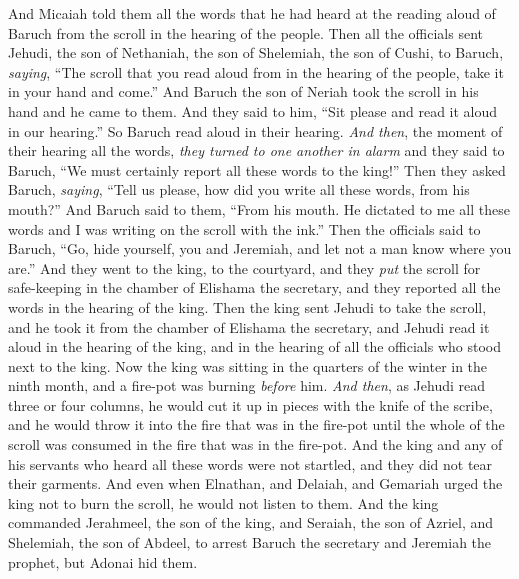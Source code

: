 \begin{biblechapter}
\verse And Micaiah told them all the words that he had heard at the reading aloud of Baruch from the scroll in the hearing of the people.
\verse Then all the officials sent Jehudi, the son of Nethaniah, the son of Shelemiah, the son of Cushi, to Baruch, \textit{saying}, “The scroll that you read aloud from in the hearing of the people, take it in your hand and come.” And Baruch the son of Neriah took the scroll in his hand and he came to them.
\verse And they said to him, “Sit please and read it aloud in our hearing.” So Baruch read aloud in their hearing.
\verse \textit{And then}, the moment of their hearing all the words, \textit{they turned to one another in alarm} and they said to Baruch, “We must certainly report all these words to the king!”
\verse Then they asked Baruch, \textit{saying}, “Tell us please, how did you write all these words, from his mouth?”
\verse And Baruch said to them, “From his mouth. He dictated to me all these words and I was writing on the scroll with the ink.”
\verse Then the officials said to Baruch, “Go, hide yourself, you and Jeremiah, and let not a man know where you are.”
\verse And they went to the king, to the courtyard, and they \textit{put} the scroll for safe-keeping in the chamber of Elishama the secretary, and they reported all the words in the hearing of the king.
\verse Then the king sent Jehudi to take the scroll, and he took it from the chamber of Elishama the secretary, and Jehudi read it aloud in the hearing of the king, and in the hearing of all the officials who stood next to the king.
\verse Now the king was sitting in the quarters of the winter in the ninth month, and a fire-pot was burning \textit{before} him.
\verse \textit{And then}, as Jehudi read three or four columns, he would cut it up in pieces with the knife of the scribe, and he would throw it into the fire that was in the fire-pot until the whole of the scroll was consumed in the fire that was in the fire-pot.
\verse And the king and any of his servants who heard all these words were not startled, and they did not tear their garments.
\verse And even when Elnathan, and Delaiah, and Gemariah urged the king not to burn the scroll, he would not listen to them.
\verse And the king commanded Jerahmeel, the son of the king, and Seraiah, the son of Azriel, and Shelemiah, the son of Abdeel, to arrest Baruch the secretary and Jeremiah the prophet, but Adonai hid them.

\end{biblechapter}
